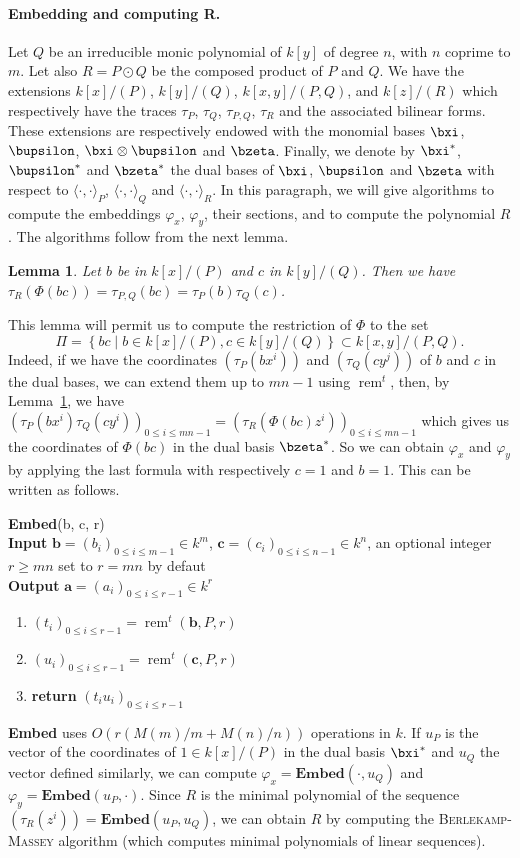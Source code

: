 \documentclass[a4paper,11pt]{article}
\theoremstyle{break}
\newtheorem{lm}[thm]{Lemma}
\theoremstyle{definition}
\theoremstyle{remark}
\DeclareMathOperator{\rem}{rem}
\newcommand{\ps}[2]{\langle#1,#2\rangle}
\newcommand{\psdot}{\ps{\cdot}{\cdot}}
\newcommand{\remt}{\rem^t}
\begin{document}
\paragraph{Embedding and computing R.} Let $Q$ be an irreducible monic
polynomial of $k[y]$ of degree $n$, with $n$ coprime to $m$. Let also $R=P\odot
Q$ be the composed product of $P$ and $Q$. We have the extensions $k[x]/(P)$,
$k[y]/(Q)$, $k[x,y]/(P,Q)$, and $k[z]/(R)$ which respectively have the traces
$\tau_P$, $\tau_Q$, $\tau_{P,Q}$, $\tau_R$ and the associated bilinear forms.
These extensions are respectively endowed with the monomial bases $\bxi$,
$\bupsilon$, $\bxi\otimes\bupsilon$ and $\bzeta$. Finally, we denote by
$\bxi^*$, $\bupsilon^*$ and $\bzeta^*$ the dual bases of $\bxi$, $\bupsilon$ and
$\bzeta$ with respect to $\psdot_P$, $\psdot_Q$ and $\psdot_R$. In this paragraph, we will
give algorithms to compute the embeddings $\varphi_x$, $\varphi_y$, their
sections, and to compute the polynomial $R$. The algorithms follow from the next
lemma.
\begin{lm}
  \label{lm-trac}
  Let $b$ be in $k[x]/(P)$ and $c$ in $k[y]/(Q)$. Then we have
  $\tau_R(\Phi(bc))=\tau_{P,Q}(bc)=\tau_P(b)\tau_Q(c)$.
\end{lm}
This lemma will permit us to compute the restriction of $\Phi$ to the set 
\[
  \Pi=\left\{ bc \;|\; b\in k[x]/(P), c\in k[y]/(Q) \right\}\subset
  k[x,y]/(P,Q).
\]
Indeed, if we have the coordinates $(\tau_P(bx^i))$ and $(\tau_Q(cy^j))$ of $b$ and
$c$ in the dual bases, we can extend them up to $mn-1$ using $\remt$, then, by Lemma~\ref{lm-trac}, we have
$(\tau_P(bx^i)\tau_Q(cy^i))_{0\leq i \leq mn-1}=(\tau_R(\Phi(bc)z^i))_{0\leq i
\leq mn-1}$ which gives us the coordinates of $\Phi(bc)$ in the dual basis
$\bzeta^*$. So we can obtain $\varphi_x$ and $\varphi_y$ by applying the last
formula with respectively $c=1$ and $b=1$. This can be written as follows.
\newline

\textbf{Embed}(b, c, r)\\
\textbf{Input} $\textbf{b}=(b_i)_{0\leq i\leq m-1}\in k^m$,
$\textbf{c}=(c_i)_{0\leq i\leq n-1}\in k^n$, an optional integer $r\geq mn$ set
to $r=mn$ by defaut\\
\textbf{Output} $\textbf{a}=(a_i)_{0\leq i\leq r-1}\in k^r$
\begin{enumerate}
  \item $(t_i)_{0\leq i \leq r-1}=\remt(\textbf{b},P,r)$
  \item $(u_i)_{0\leq i \leq r-1}=\remt(\textbf{c},P,r)$
  \item \textbf{return} $(t_iu_i)_{0\leq i \leq r-1}$
\end{enumerate}
\textbf{Embed} uses $O(r(M(m)/m + M(n)/n))$ operations in $k$.
If $u_P$ is the vector of the coordinates of $1\in k[x]/(P)$ in the dual basis
$\bxi^*$ and $u_Q$ the vector defined similarly, we can compute
$\varphi_x=\textbf{Embed}(\cdot,u_Q)$ and $\varphi_y=\textbf{Embed}(u_P,\cdot)$.
Since $R$ is the minimal polynomial of the sequence
$(\tau_R(z^i))=\textbf{Embed}(u_P,u_Q)$, we can obtain $R$ by computing the
\textsc{Berlekamp-Massey} algorithm (which computes minimal polynomials of linear
sequences).
\end{document}
